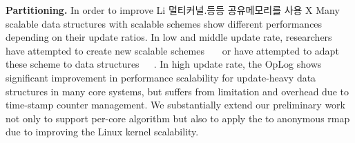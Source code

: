 \else

\fi

\ifkor
\noindent
\textbf{Partitioning.}
In order to improve Li
멀티커널.등등 공유메모리를 사용 X
Many scalable data structures with scalable schemes show
different performances depending on their update ratios.
In low and middle update rate, researchers have attempted to create new scalable
schemes~\cite{McKenney98}~\cite{Matveev2015RLU}~\cite{Harris2001Lockfree}
or have attempted to adapt these scheme to data structures~\cite{Arbel2014ConcurrentRCU}~\cite{Dodds2015SCT}~\cite{AustinTClements2012RCUBalancedTrees}.
In high update rate, the OpLog shows significant improvement in
performance scalability for update-heavy data structures in
many core systems, but suffers from limitation and overhead due
to time-stamp counter management.
We substantially extend our preliminary work~\cite{Kyong2016LDU} not only to support 
per-core algorithm but also to apply the  to anonymous rmap due to improving the
Linux kernel scalability.
\else

\fi



